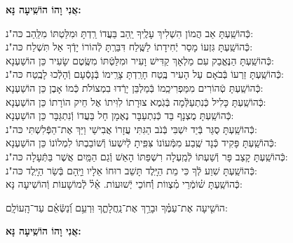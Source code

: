 \documentclass[twoside, openany, parskip=half, 11pt]{book}
\begin{document}
\begin{large}
\textbf{אֲנִי וָהוֹ הוֹשִֽׁיעָה נָּא:}
\end{large}

\begin{small}
כְּֿהוֹשַֽׁעְתָּ אַב הֲמוֹן הִשְׁלִיךְ עָלֶֽיךָ יַֽהַב בַּעֲדוֹ רַֽדְתָּ וּמִלַּטְתּוֹ מִלַּֽהַב \hfill כּה"נ:\\
כְּֿהוֹשַֽׁעְתָּ גִּזְעוֹ מָסַר יְֿחִידָתוֹ לַשֶּֽׁלַח דִּבַּרְֽתָּ לְֿהוֹרוֹ יָדְֿךָ אַל תִּשְׁלַח \hfill כּה"נ: \\
כְּֿהוֹשַֽׁעְתָּ הַנֶּאֱבַק עִם מַלְאָךְ קַדִּישׁ וָעִיר וּמִלַּטְֿתּוֹ מִשֶּֽׂטֶם שָׂעִיר \hfill כֵּן הוֹשַׁעְנָא: \\
כְּֿהוֹשַֽׁעְתָּ זַרְעוֹ בְּֿבֹאָם עַל הָעִיר בֶּֽטַח חָרַֽדְתָּ צָרֵֽימוֹ בְּֿנָסְֿעָם וְֿהָלְֿכוּ לָבֶֽטַח \hfill כּה"נ: \\
כְּֿהוֹשַֽׁעְתָּ טְֿהוֹרִים מִמַּפְרִיכֵֽמוֹ בְּֿמַלְבֵּן יָרְֿדוּ בִמְצוֹלֹת כְּֿמוֹ אָבֶן \hfill כֵּן הוֹשַׁעְנָא: \\
כְּֿהוֹשַֽׁעְתָּ כָּלִיל כְּֿנִתְעַלְּֿמָה בְּֿגֹֽמֶא צוּרָתוֹ לִוִּיתוֹ אֶל חֵיק הוֹרָתוֹ \hfill כֵּן הוֹשַׁעְנָא: \\
כְּֿהוֹשַֽׁעְתָּ מֻצְנָף בַּד כְּֿנִתְעַבָּר נֶאֶמָן חָל בַּעֲדוֹ וְֿנִתְגַּבָּר \hfill כֵּן הוֹשַׁעְנָא: \\
כְּֿהוֹשַֽׁעְתָּ סֻגַּר בְּֿיַד יִשְׁבִּי בְּֿנֹב הַגִּתִּי עֲזָרוֹ אֲבִישַׁי וַיַּךְ אֶת־הַפְּֿלִשְׁתִּי \hfill כּה"נ:\\
כְּֿהוֹשַֽׁעְתָּ פָּקִיד כְּֿנָד שֶֽׁבַע מִמְּֿעוֹנוֹ צִּפִּֽיתָ לְֿיִשְׁעוֹ וְֿשׁוֹבַבְתּוֹ לִמְלוֹנוֹ \hfill כֵּן הוֹשַׁעְנָא:\\
כְּֿהוֹשַֽׁעְתָּ קָצַב פָּר וְֿשַׁעְתּוֹ לְֿמַֽעְלָה רִשְׁפַּתּוֹ הָאֵשׁ וְֿגַם הַמַּֽיִם אֲשֶׁר בַּתְּֿעָלָה \hfill כּה"נ:\\
כְּֿהוֹשַֽׁעְתָּ שִׁוַע לְֿךָ כִּי מֵת הַיָּֽלֶד תָּשֵׁב רוּחוֹ אֵלָיו וַיָּֽהָם בְּֿשַׂר הַיָּֽלֶד \hfill כּה"נ:\\
כְּֿהוֹשַֽׁעְתָּ שׁ֗וֹמְֿרֵי מִ֗צְווֹת וְֿ֗חוֹכֵי יְֿשׁוּעוֹת. אֵ֗ל֗ לְֿמוֹשָׁעוֹת \hfill וְֿהוֹשִׁיעָה נָּא:\\

\end{small}

הוֹשִׁ֤יעָה אֶת־עַמֶּ֗ךָ וּבָרֵ֥ךְ אֶת־נַֽחֲלָתֶ֑ךָ וּֽרְעֵ֥ם וְֿ֝נַשְּֿׂאֵ֗ם עַד־הָֽעוֹלָֽם:


\begin{large}
\textbf{אֲנִי וָהוֹ הוֹשִֽׁיעָה נָּא:}
\end{large}
\end{document}
